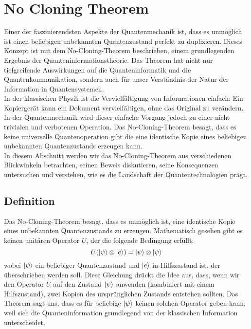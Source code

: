 \section{No Cloning Theorem} 
\label{sec:no-cloning}

Einer der faszinierendsten Aspekte der Quantenmechanik ist, dass es unmöglich ist
einen beliebigen unbekannten Quantenzustand perfekt zu duplizieren.
Dieses Konzept ist mit dem No-Cloning-Theorem beschrieben, einem grundlegenden Ergebnis der Quanteninformationstheorie.
Das Theorem hat nicht nur tiefgreifende Auswirkungen auf die Quanteninformatik und die Quantenkommunikation,
sondern auch für unser Verständnis der Natur der Information in Quantensystemen.\\

In der klassischen Physik ist die Vervielfältigung von Informationen einfach:
Ein Kopiergerät kann ein Dokument vervielfältigen, ohne das Original zu verändern.
In der Quantenmechanik wird dieser einfache Vorgang jedoch zu einer nicht trivialen und verbotenen Operation.
Das No-Cloning-Theorem besagt, dass es keine universelle Quantenoperation gibt
die eine identische Kopie eines beliebigen unbekannten Quantenzustands erzeugen kann.\\

In diesem Abschnitt werden wir das No-Cloning-Theorem aus verschiedenen Blickwinkeln betrachten, seinen Beweis diskutieren,
seine Konsequenzen untersuchen und verstehen, wie es die Landschaft der Quantentechnologien prägt.

\subsection{Definition}\label{subsec:definition}
Das No-Cloning-Theorem besagt, dass es unmöglich ist, eine identische Kopie eines unbekannten Quantenzustands zu erzeugen.
Mathematisch gesehen gibt es keinen unitären Operator $U$, der die folgende Bedingung erfüllt:
\begin{equation}
    U(\ket{\psi}\otimes\ket{e})=\ket{\psi}\otimes\ket{\psi}\label {eq:cloning_assertion}
\end{equation}
wobei $\ket{\psi}$ ein beliebiger Quantenzustand und $\ket{e}$ in Hilfszustand ist, der überschrieben werden soll.
Diese Gleichung drückt die Idee aus, dass, wenn wir den Operator $U$ auf den Zustand $\ket{\psi}$ anwenden
(kombiniert mit einem Hilfszustand), zwei Kopien des ursprünglichen Zustands entstehen sollten.
Das Theorem sagt uns, dass es für beliebige $\ket{\psi}$ keinen solchen Operator geben kann,
weil sich die Quanteninformation grundlegend von der klassischen Information unterscheidet.
